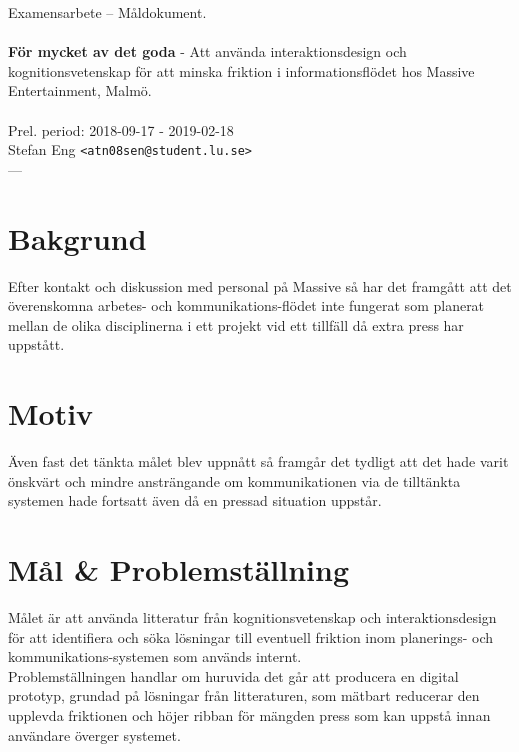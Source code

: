 \documentclass{article}
\begin{document}
\begin{center}

  Examensarbete -- Måldokument. \\
  \ \\
  {\large
    \textbf{För mycket av det goda} -
    Att använda interaktionsdesign och kognitionsvetenskap för
    att minska friktion i informationsflödet hos Massive
    Entertainment, Malmö. \\
  }
  \ \\
  Prel. period: 2018-09-17 - 2019-02-18\\
  Stefan Eng \texttt{<atn08sen@student.lu.se>}
  \ \\
  ---
  \vspace{-0.3cm}

\end{center}

\section*{Bakgrund}

  Efter kontakt och diskussion med personal på Massive så har det framgått att
  det överenskomna arbetes- och kommunikations-flödet inte fungerat som
  planerat mellan de olika disciplinerna i ett projekt vid ett tillfäll då
  extra press har uppstått.

\section*{Motiv}

  Även fast det tänkta målet blev uppnått så framgår det tydligt att det hade
  varit önskvärt och mindre ansträngande om kommunikationen via de
  tilltänkta systemen hade fortsatt även då en pressad situation uppstår.

\section*{Mål \& Problemställning}

  Målet är att använda litteratur från kognitionsvetenskap och interaktionsdesign
  för att identifiera och söka lösningar till eventuell friktion inom
  planerings- och kommunikations-systemen som används internt. \\

  Problemställningen handlar om huruvida det går att producera en
  digital prototyp, grundad på lösningar från litteraturen, som mätbart
  reducerar den upplevda friktionen och höjer ribban för mängden press som kan
  uppstå innan användare överger systemet.
\end{document}
